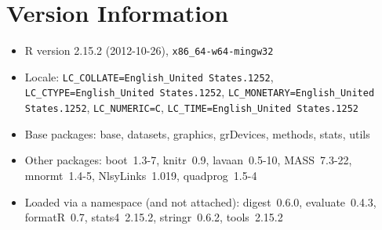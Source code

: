 \documentclass[letterpaper]{article}\usepackage{graphicx, color}
\begin{document}
\section{Version Information}
\begin{itemize}\raggedright
  \item R version 2.15.2 (2012-10-26), \verb|x86_64-w64-mingw32|
  \item Locale: \verb|LC_COLLATE=English_United States.1252|, \verb|LC_CTYPE=English_United States.1252|, \verb|LC_MONETARY=English_United States.1252|, \verb|LC_NUMERIC=C|, \verb|LC_TIME=English_United States.1252|
  \item Base packages: base, datasets, graphics, grDevices,
    methods, stats, utils
  \item Other packages: boot~1.3-7, knitr~0.9, lavaan~0.5-10,
    MASS~7.3-22, mnormt~1.4-5, NlsyLinks~1.019, quadprog~1.5-4
  \item Loaded via a namespace (and not attached): digest~0.6.0,
    evaluate~0.4.3, formatR~0.7, stats4~2.15.2, stringr~0.6.2,
    tools~2.15.2
\end{itemize}



\end{document}
